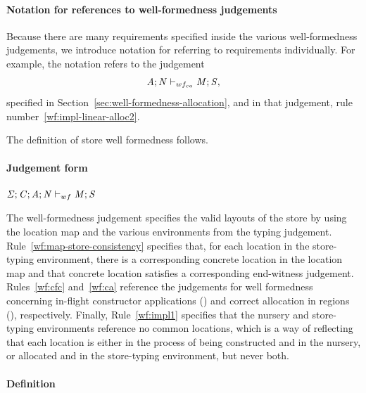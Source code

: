 \documentclass[showabstract,showacknowledgments,showpreface,showdedication]{iuphd}
\theoremstyle{nonumberplain}
\begin{document}
\paragraph{Notation for references to well-formedness judgements}
Because there are many requirements specified inside the various
well-formedness judgements, we introduce notation for referring
to requirements individually.
%
For example, the notation
refers to the judgement
\begin{align*}
\mathit{A};\mathit{N} \vdash_{wf_{ca}} \mathit{M};\mathit{S},
\end{align*}
specified in Section~\ref{sec:well-formedness-allocation},
and in that judgement, rule number~\ref{wf:impl-linear-alloc2}.

The definition of store well formedness follows.

\paragraph{Judgement form}

$\mathit{\Sigma};\mathit{C};\mathit{A};\mathit{N} \vdash_{wf} \mathit{M};\mathit{S}$

The well-formedness judgement specifies the valid layouts of the store by using the location
map and the various environments from the typing judgement.
%
Rule~\ref{wf:map-store-consistency} specifies that, for each location in the store-typing environment,
there is a corresponding concrete location in the location map and that concrete location satisfies
a corresponding end-witness judgement.
%
Rules~\ref{wf:cfc} and~\ref{wf:ca} reference the judgements for well formedness concerning
in-flight constructor applications () and correct allocation in
regions (), respectively.
%
Finally, Rule~\ref{wf:impl1} specifies that the nursery and store-typing environments reference
no common locations, which is a way of reflecting that each location is either in the process
of being constructed and in the nursery, or allocated and in the store-typing environment, but
never both.

\paragraph{Definition}
\end{document}
